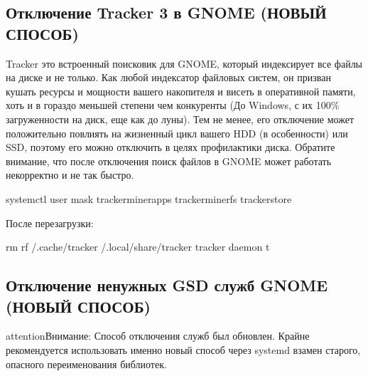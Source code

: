 \documentclass[letterpaper,10pt,russian,openany]{sphinxmanual}
\begin{document}
\ignorespaces 

\subsection{Отключение Tracker 3 в GNOME (НОВЫЙ СПОСОБ)}
\label{\detokenize{source/de-optimizations:tracker-3-gnome}}\label{\detokenize{source/de-optimizations:disabling-tracker-3}}\label{\detokenize{source/de-optimizations:index-3}}
\sphinxAtStartPar
Tracker \sphinxhyphen{} это встроенный поисковик для GNOME, который индексирует все файлы на диске и не только.
Как любой индексатор файловых систем, он призван кушать ресурсы и мощности вашего накопителя и висеть в оперативной памяти,
хоть и в гораздо меньшей степени чем конкуренты (До Windows, с их 100\% загруженности на диск, еще как до луны).
Тем не менее, его отключение может положительно повлиять на жизненный цикл вашего HDD (в особенности) или SSD,
поэтому его можно отключить в целях профилактики диска.
Обратите внимание, что после отключения поиск файлов в GNOME может работать некорректно и не так быстро.

\sphinxAtStartPar
{}

\begin{sphinxVerbatim}[commandchars=\\\{\}]
systemctl \PYGZhy{}\PYGZhy{}user mask tracker\PYGZhy{}miner\PYGZhy{}apps tracker\PYGZhy{}miner\PYGZhy{}fs tracker\PYGZhy{}store
\end{sphinxVerbatim}

\sphinxAtStartPar
После перезагрузки:

\begin{sphinxVerbatim}[commandchars=\\\{\}]
rm \PYGZhy{}rf \PYGZti{}/.cache/tracker \PYGZti{}/.local/share/tracker   
tracker daemon \PYGZhy{}t                                
\end{sphinxVerbatim}

\ignorespaces 

\subsection{Отключение ненужных GSD служб GNOME (НОВЫЙ СПОСОБ)}
\label{\detokenize{source/de-optimizations:gsd-gnome}}\label{\detokenize{source/de-optimizations:disabling-gsd-daemons}}\label{\detokenize{source/de-optimizations:index-4}}
\begin{sphinxadmonition}{attention}{Внимание:}
\sphinxAtStartPar
Способ отключения служб был обновлен.
Крайне рекомендуется использовать именно новый способ через systemd взамен старого, опасного переименования библиотек.
\end{sphinxadmonition}
\end{document}
